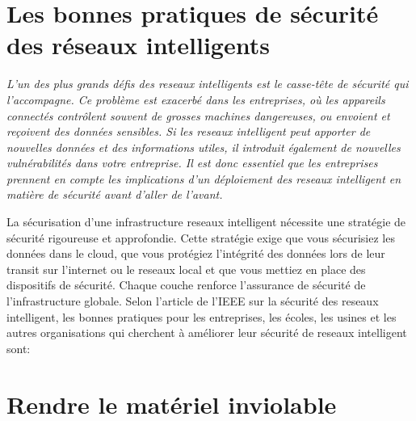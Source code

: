\documentclass[12pt]{report}
\begin{document}
\hypertarget{les-meilleures-pratiques-de-suxe9curituxe9-de-lreseaux intelligent}{%
      \section{\texorpdfstring{Les bonnes pratiques de sécurité des réseaux intelligents
        }{Les bonnes pratiques de sécurité des réseaux intelligents}}\label{les-meilleures-pratiques-de-suxe9curituxe9-de-lreseaux intelligent}}

\emph{L'un des plus grands défis des reseaux intelligents est le
      casse-tête de sécurité qui l'accompagne. Ce problème est exacerbé dans
      les entreprises, où les appareils connectés contrôlent souvent de
      grosses machines dangereuses, ou envoient et reçoivent des données
      sensibles. Si les reseaux intelligent peut apporter de nouvelles données et des
      informations utiles, il introduit également de nouvelles vulnérabilités
      dans votre entreprise. Il est donc essentiel que les entreprises
      prennent en compte les implications d'un déploiement des reseaux intelligent en matière
      de sécurité avant d'aller de l'avant.}

La sécurisation d'une infrastructure reseaux intelligent nécessite une stratégie de
sécurité rigoureuse et approfondie. Cette stratégie exige que vous
sécurisiez les données dans le cloud, que vous protégiez l'intégrité des
données lors de leur transit sur l'internet ou  le reseaux local et que vous mettiez
en place des dispositifs de sécurité. Chaque couche renforce l'assurance
de sécurité de l'infrastructure globale. Selon l'article de l'IEEE sur
la sécurité des reseaux intelligent, les bonnes pratiques pour les entreprises, les
écoles, les usines et les autres organisations qui cherchent à améliorer
leur sécurité de reseaux intelligent sont:

\hypertarget{rendre-le-matuxe9riel-inviolable}{%
      \section{\texorpdfstring{\textbf{Rendre le matériel inviolable}
        }{Rendre le matériel inviolable }}\label{rendre-le-matuxe9riel-inviolable}}
\end{document}
